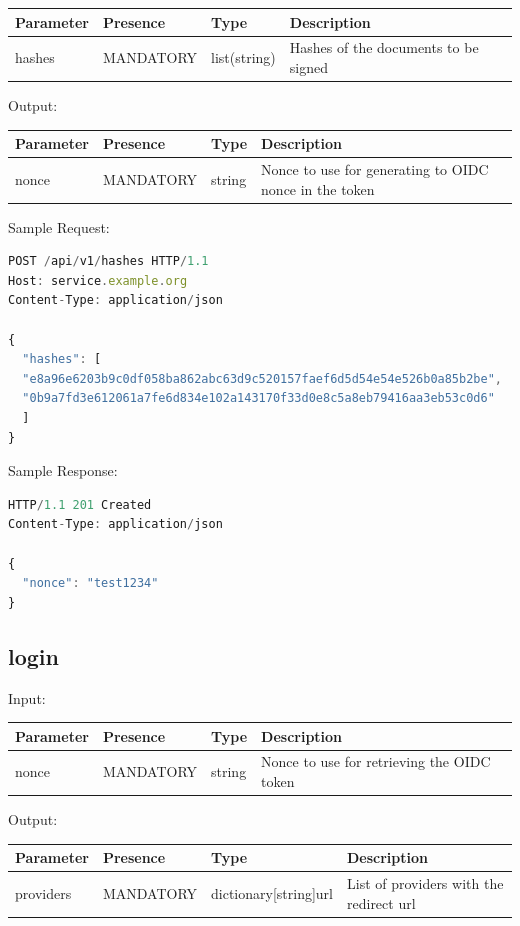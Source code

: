 \begin{tabular}{|l|l|l|l|}
	\hline
	Parameter & Presence & Type & Description \\ \hline
	hashes & MANDATORY & list(string) & Hashes of the documents to be signed \\ \hline
\end{tabular}

Output:

\begin{tabular}{|l|l|l|l|}
	\hline
	Parameter & Presence & Type & Description \\ \hline
	nonce & MANDATORY & string & Nonce to use for generating to OIDC nonce in the token \\ \hline
\end{tabular}

Sample Request:
\begin{lstlisting}[caption={hashes request}, captionpos=b, language=JavaScript, label={lst:hashesrequest}]
POST /api/v1/hashes HTTP/1.1
Host: service.example.org
Content-Type: application/json

{
  "hashes": [
  "e8a96e6203b9c0df058ba862abc63d9c520157faef6d5d54e54e526b0a85b2be",
  "0b9a7fd3e612061a7fe6d834e102a143170f33d0e8c5a8eb79416aa3eb53c0d6"
  ]
}
\end{lstlisting}

Sample Response:
\begin{lstlisting}[caption={hashes response}, captionpos=b, language=JavaScript, label={lst:hashesresponse}]
HTTP/1.1 201 Created
Content-Type: application/json

{
  "nonce": "test1234"
}
\end{lstlisting}

\subsection{login}
Input:

\begin{tabular}{|l|l|l|l|}
	\hline
	Parameter & Presence & Type & Description \\ \hline
	nonce & MANDATORY & string & Nonce to use for retrieving the OIDC token \\ \hline
\end{tabular}

Output:

\begin{tabular}{|l|l|l|l|}
	\hline
	Parameter & Presence & Type & Description \\ \hline
	providers & MANDATORY & dictionary[string]url & List of providers with the redirect url \\ \hline
\end{tabular}


